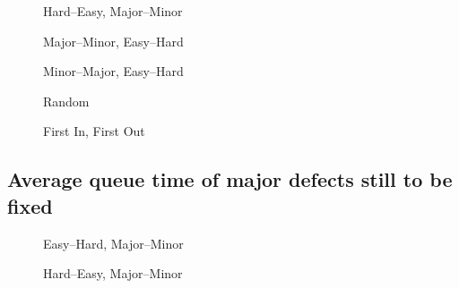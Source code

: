 \documentclass[a4paper,10pt]{article}
\begin{document}
\begin{appendices}
  \begin{figure}[!htb]
    \centering
    
    \caption{Hard--Easy, Major--Minor}
  \end{figure}
  
  \begin{figure}[!htb]
    \centering
    
    \caption{Major--Minor, Easy--Hard}
  \end{figure}
  
  \begin{figure}[!htb]
    \centering
    
    \caption{Minor--Major, Easy--Hard}
  \end{figure}
  
  \begin{figure}[!htb]
    \centering
    
    \caption{Random}
  \end{figure}
  
  \begin{figure}[!htb]
    \centering
    
    \caption{First In, First Out}
  \end{figure}
  
  
  \clearpage
  \subsection{Average queue time of major defects still to be fixed}
  \begin{figure}[!htb]
    \centering
    
    \caption{Easy--Hard, Major--Minor}
  \end{figure}
  
  \begin{figure}[!htb]
    \centering
    
    \caption{Hard--Easy, Major--Minor}
  \end{figure}
  

\end{appendices}
\end{document}
